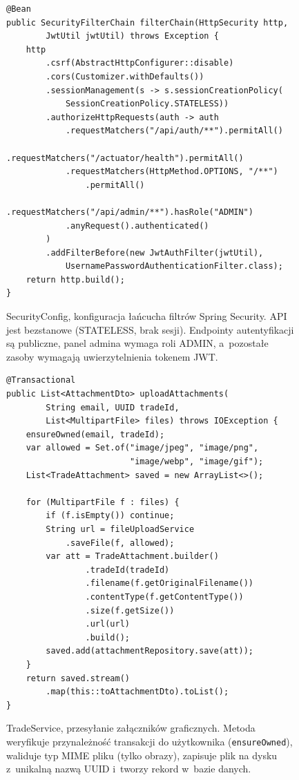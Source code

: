 \documentclass[12pt,a4paper]{article}
\begin{document}
\begin{figure}[H]
\begin{lstlisting}[style=java, caption={}, label={}]
@Bean
public SecurityFilterChain filterChain(HttpSecurity http,
        JwtUtil jwtUtil) throws Exception {
    http
        .csrf(AbstractHttpConfigurer::disable)
        .cors(Customizer.withDefaults())
        .sessionManagement(s -> s.sessionCreationPolicy(
            SessionCreationPolicy.STATELESS))
        .authorizeHttpRequests(auth -> auth
            .requestMatchers("/api/auth/**").permitAll()
            .requestMatchers("/actuator/health").permitAll()
            .requestMatchers(HttpMethod.OPTIONS, "/**")
                .permitAll()
            .requestMatchers("/api/admin/**").hasRole("ADMIN")
            .anyRequest().authenticated()
        )
        .addFilterBefore(new JwtAuthFilter(jwtUtil),
            UsernamePasswordAuthenticationFilter.class);
    return http.build();
}
\end{lstlisting}
\caption{SecurityConfig, konfiguracja łańcucha filtrów Spring Security. API jest bezstanowe (STATELESS, brak sesji). Endpointy autentyfikacji są publiczne, panel admina wymaga roli ADMIN, a~pozostałe zasoby wymagają uwierzytelnienia tokenem JWT.}
\label{fig:security-config}
\end{figure}

\begin{figure}[H]
\begin{lstlisting}[style=java, caption={}, label={}]
@Transactional
public List<AttachmentDto> uploadAttachments(
        String email, UUID tradeId,
        List<MultipartFile> files) throws IOException {
    ensureOwned(email, tradeId);
    var allowed = Set.of("image/jpeg", "image/png",
                         "image/webp", "image/gif");
    List<TradeAttachment> saved = new ArrayList<>();

    for (MultipartFile f : files) {
        if (f.isEmpty()) continue;
        String url = fileUploadService
            .saveFile(f, allowed);
        var att = TradeAttachment.builder()
                .tradeId(tradeId)
                .filename(f.getOriginalFilename())
                .contentType(f.getContentType())
                .size(f.getSize())
                .url(url)
                .build();
        saved.add(attachmentRepository.save(att));
    }
    return saved.stream()
        .map(this::toAttachmentDto).toList();
}
\end{lstlisting}
\caption{TradeService, przesyłanie załączników graficznych. Metoda weryfikuje przynależność transakcji do użytkownika (\texttt{ensureOwned}), waliduje typ MIME pliku (tylko obrazy), zapisuje plik na dysku z~unikalną nazwą UUID i~tworzy rekord w~bazie danych.}
\label{fig:upload-attachments}
\end{figure}
\end{document}
